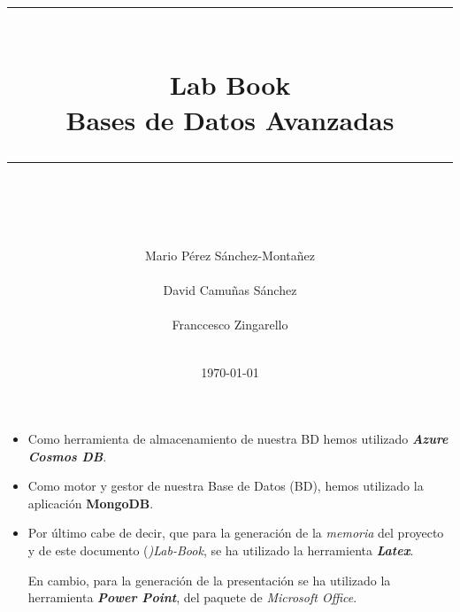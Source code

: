 \documentclass[idxtotoc,hyperref,openany]{labbook} %
\newcommand{\HRule}{\rule{\linewidth}{0.5mm}} %
\begin{document}

\frontmatter %
\title{
\begin{center}
	\centering
\HRule \\[0.4cm]
{\Huge \bfseries Lab Book \\[0.5cm] \Large Bases de Datos Avanzadas}\\[0.4cm] %
\HRule \\[1.5cm]
\end{center}
}
\author{\Huge Mario Pérez Sánchez-Montañez \\ \\ \Huge David Camuñas Sánchez \\ \\ \Huge Franccesco Zingarello \\ \\[2cm]} %
\date{\today}
\maketitle

\tableofcontents

\mainmatter %









\begin{itemize}
	\item Como herramienta de almacenamiento de nuestra BD hemos utilizado \textbf{\textit{Azure Cosmos DB}}.
	
	\item  Como motor y gestor de nuestra Base de Datos (BD), hemos utilizado la aplicación \textbf{MongoDB}.
	
	\item  Por último cabe de decir, que para la generación de la \textit{memoria} del proyecto y de este documento (\textit{)Lab-Book}, se ha utilizado la herramienta \textit{\textbf{Latex}}.
	
	En cambio, para la generación de la presentación se ha utilizado la herramienta \textit{\textbf{Power Point}}, del paquete de \textit{Microsoft Office}.
\end{itemize}
\end{document}
